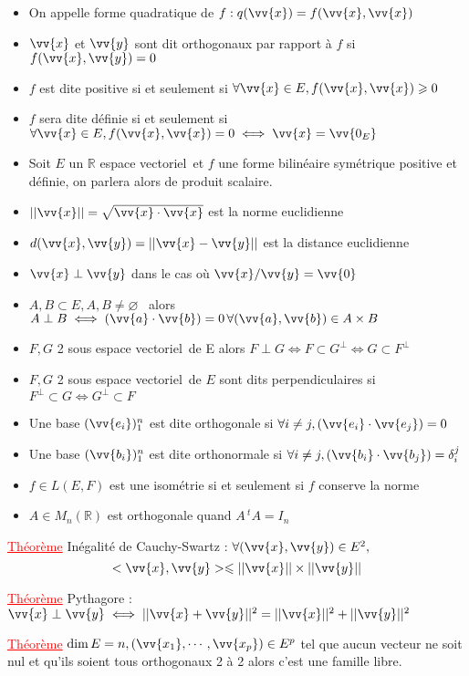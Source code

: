 \documentclass[a4paper, french]{article}
\newcommand{\R}{\mathbb{R}}
\newcommand{\ev}{espace vectoriel}
\newcommand{\de}{\delta}
\newcommand{\thm}{\textcolor{red}{\underline{Théorème} }}
\begin{document}
	 \begin{itemize}[label=\(\bullet\)]
		\item On appelle forme quadratique de $f: q(\vv{x})=f(\vv{x},\vv{x})$
		\item $\vv{x}$ et $\vv{y}$ sont dit orthogonaux par rapport à $f$ si $f(\vv{x},\vv{y})=0$
		\item $f$ est dite positive si et seulement si $\forall \vv{x} \in  E, f(\vv{x},\vv{x})\geqslant 0$
		\item $f$ sera dite définie si et seulement si ${\forall \vv{x} \in  E}, f(\vv{x},\vv{x})=0 \iff \vv{x}=\vv{0_E}$
		\item Soit $E$ un $\R$ \ev \, et $f$ une forme bilinéaire symétrique positive et définie, on parlera alors de produit scalaire.
		\item $||\vv{x}||=\sqrt{\vv{x} \cdot \vv{x}}$ est la norme euclidienne
		\item $d(\vv{x},\vv{y})=||\vv{x}-\vv{y}||$ est la distance euclidienne
		\item $\vv{x}\perp\vv{y}$ dans le cas où $\vv{x}/\vv{y}=\vv{0}$
		\item $A,B \subset E, A,B \neq \varnothing$ \, alors $A\perp B \iff {(\vv{a}\cdot\vv{b})=0} \, {\forall (\vv{a},\vv{b}) \in A\times B}$
		\item $F,G$ 2 sous \ev \, de E alors $F\perp G \iff F\subset G^{\perp} \iff G \subset F^{\perp}$
		\item $F,G$ 2 sous \ev \, de $E$ sont dits perpendiculaires si ${F^{\perp} \subset G \iff G^{\perp} \subset F}$
		\item Une base $(\vv{e_i})_1^n$ est dite orthogonale si $\forall i \neq j, (\vv{e_i}\cdot \vv{e_j})=0$
		\item Une base $(\vv{b_i})_1^n$ est dite orthonormale si $\forall i \neq j, (\vv{b_i}\cdot \vv{b_j})=\de_i^j$
		\item $f \in L(E,F)$ est une isométrie si et seulement si $f$ conserve la norme 
		\item $A \in M_n(\R)$ est orthogonale quand $A\,^tA=I_n$
	 \end{itemize}

	  \thm Inégalité de Cauchy-Swartz : \(\forall (\vv{x},\vv{y}) \in E^2,\)
	\[<\vv{x},\vv{y}> \leqslant ||\vv{x}|| \times ||\vv{y}||\]

	  \thm Pythagore : $\vv{x} \perp \vv{y} \iff {||\vv{x}+\vv{y}||^2=||\vv{x}||^2+||\vv{y}||^2}$ 
	 
	  \thm $\dim E=n, (\vv{x_1},\cdots,\vv{x_p}) \in E^p$ tel que aucun vecteur ne soit nul et qu'ils soient tous orthogonaux 2 à 2 alors c'est une famille libre. 
	 
\end{document}
